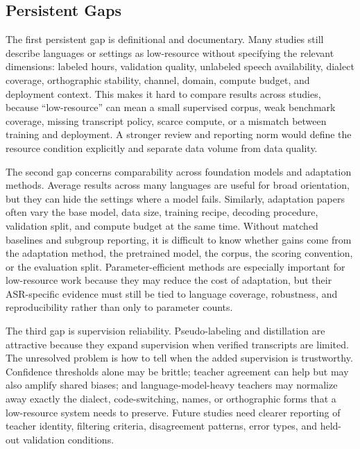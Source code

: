 \documentclass[pdflatex,sn-basic]{sn-jnl}
\theoremstyle{thmstyleone}
\theoremstyle{thmstyletwo}
\theoremstyle{thmstylethree}
\begin{document}
\subsection{Persistent Gaps}

The first persistent gap is definitional and documentary. Many studies still describe languages or settings as low-resource without specifying the relevant dimensions: labeled hours, validation quality, unlabeled speech availability, dialect coverage, orthographic stability, channel, domain, compute budget, and deployment context. This makes it hard to compare results across studies, because ``low-resource'' can mean a small supervised corpus, weak benchmark coverage, missing transcript policy, scarce compute, or a mismatch between training and deployment. A stronger review and reporting norm would define the resource condition explicitly and separate data volume from data quality.

The second gap concerns comparability across foundation models and adaptation methods. Average results across many languages are useful for broad orientation, but they can hide the settings where a model fails. Similarly, adaptation papers often vary the base model, data size, training recipe, decoding procedure, validation split, and compute budget at the same time. Without matched baselines and subgroup reporting, it is difficult to know whether gains come from the adaptation method, the pretrained model, the corpus, the scoring convention, or the evaluation split. Parameter-efficient methods are especially important for low-resource work because they may reduce the cost of adaptation, but their ASR-specific evidence must still be tied to language coverage, robustness, and reproducibility rather than only to parameter counts.

The third gap is supervision reliability. Pseudo-labeling and distillation are attractive because they expand supervision when verified transcripts are limited. The unresolved problem is how to tell when the added supervision is trustworthy. Confidence thresholds alone may be brittle; teacher agreement can help but may also amplify shared biases; and language-model-heavy teachers may normalize away exactly the dialect, code-switching, names, or orthographic forms that a low-resource system needs to preserve. Future studies need clearer reporting of teacher identity, filtering criteria, disagreement patterns, error types, and held-out validation conditions.
\end{document}
